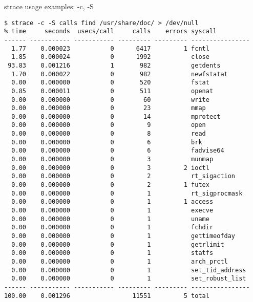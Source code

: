 \begin{frame}[fragile]{strace usage examples: -c, -S}
\tiny
\begin{verbatim}
$ strace -c -S calls find /usr/share/doc/ > /dev/null 
% time     seconds  usecs/call     calls    errors syscall
------ ----------- ----------- --------- --------- ----------------
  1.77    0.000023           0      6417         1 fcntl
  1.85    0.000024           0      1992           close
 93.83    0.001216           1       982           getdents
  1.70    0.000022           0       982           newfstatat
  0.00    0.000000           0       520           fstat
  0.85    0.000011           0       511           openat
  0.00    0.000000           0        60           write
  0.00    0.000000           0        23           mmap
  0.00    0.000000           0        14           mprotect
  0.00    0.000000           0         9           open
  0.00    0.000000           0         8           read
  0.00    0.000000           0         6           brk
  0.00    0.000000           0         6           fadvise64
  0.00    0.000000           0         3           munmap
  0.00    0.000000           0         3         2 ioctl
  0.00    0.000000           0         2           rt_sigaction
  0.00    0.000000           0         2         1 futex
  0.00    0.000000           0         1           rt_sigprocmask
  0.00    0.000000           0         1         1 access
  0.00    0.000000           0         1           execve
  0.00    0.000000           0         1           uname
  0.00    0.000000           0         1           fchdir
  0.00    0.000000           0         1           gettimeofday
  0.00    0.000000           0         1           getrlimit
  0.00    0.000000           0         1           statfs
  0.00    0.000000           0         1           arch_prctl
  0.00    0.000000           0         1           set_tid_address
  0.00    0.000000           0         1           set_robust_list
------ ----------- ----------- --------- --------- ----------------
100.00    0.001296                 11551         5 total
\end{verbatim}
\end{frame}


